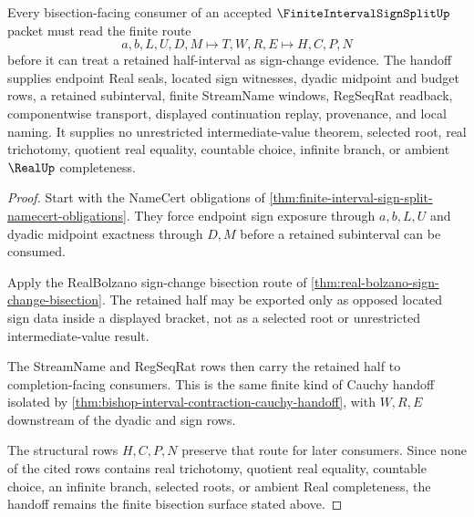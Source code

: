 \begin{theorem}
\label{thm:finite-interval-sign-split-bisection-handoff}
Every bisection-facing consumer of an accepted $\FiniteIntervalSignSplitUp$ packet must read the finite route
$$
a,b,L,U,D,M \longmapsto T,W,R,E \longmapsto H,C,P,N
$$
before it can treat a retained half-interval as sign-change evidence. The handoff supplies endpoint Real seals, located sign witnesses, dyadic midpoint and budget rows, a retained subinterval, finite StreamName windows, RegSeqRat readback, componentwise transport, displayed continuation replay, provenance, and local naming. It supplies no unrestricted intermediate-value theorem, selected root, real trichotomy, quotient real equality, countable choice, infinite branch, or ambient $\RealUp$ completeness.
\end{theorem}
\begin{proof}
Start with the NameCert obligations of \autoref{thm:finite-interval-sign-split-namecert-obligations}. They force endpoint sign exposure through $a,b,L,U$ and dyadic midpoint exactness through $D,M$ before a retained subinterval can be consumed.

Apply the RealBolzano sign-change bisection route of \autoref{thm:real-bolzano-sign-change-bisection}. The retained half may be exported only as opposed located sign data inside a displayed bracket, not as a selected root or unrestricted intermediate-value result.

The StreamName and RegSeqRat rows then carry the retained half to completion-facing consumers. This is the same finite kind of Cauchy handoff isolated by \autoref{thm:bishop-interval-contraction-cauchy-handoff}, with $W,R,E$ downstream of the dyadic and sign rows.

The structural rows $H,C,P,N$ preserve that route for later consumers. Since none of the cited rows contains real trichotomy, quotient real equality, countable choice, an infinite branch, selected roots, or ambient Real completeness, the handoff remains the finite bisection surface stated above.
\end{proof}



